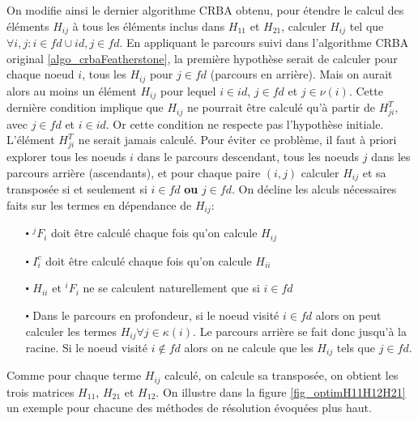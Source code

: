 \documentclass{report}
\begin{document}
On modifie ainsi le dernier algorithme CRBA obtenu, pour étendre le calcul des éléments $H_{ij}$ à tous les éléments inclus dans $H_{11}$ et $H_{21}$, \cad calculer $H_{ij}$ tel que $\forall i,j: i \in fd \cup id, j \in fd$. En appliquant le parcours suivi dans l'algorithme CRBA original \ref{algo_crbaFeatherstone}, la première hypothèse serait de calculer pour chaque noeud $i$, tous les $H_{ij}$ pour $j \in fd$ (parcours en arrière). Mais on aurait alors au moins un élément $H_{ij}$ pour lequel $i \in id$, $j \in fd$ et $j \in \nu(i)$. Cette dernière condition implique que $H_{ij}$ ne pourrait être calculé qu'à partir de $H_{ji}^T$, avec $j \in fd$ et $i \in id$. Or cette condition ne respecte pas l'hypothèse initiale. L'élément $H_{ji}^T$ ne serait jamais calculé. Pour éviter ce problème, il faut à priori explorer tous les noeuds $i$ dans le parcours descendant, tous les noeuds $j$ dans les parcours arrière (ascendants), et pour chaque paire $(i,j)$ calculer $H_{ij}$ et sa transposée si et seulement si $i \in fd$ \textbf{ou} $j \in fd$.
On décline les alculs nécessaires faits sur les termes en dépendance de $H_{ij}$: \\
\begin{itemize}
\item[$\centerdot$] $^jF_i$ doit être calculé chaque fois qu'on calcule $H_{ij}$
\item[$\centerdot$] $I_i^c$ doit être calculé chaque fois qu'on calcule $H_{ii}$
\item[$\centerdot$] $H_{ii}$ et $^iF_i$ ne se calculent naturellement que si $i \in fd$
\item[$\centerdot$] Dans le parcours en profondeur, si le noeud visité $i \in fd$ alors on peut calculer les termes $H_{ij} \forall j \in \kappa(i)$. Le parcours arrière se fait donc jusqu'à la racine. Si le noeud visité $i \notin fd$ alors on ne calcule que les $H_{ij}$ tels que $j \in fd$.
\end{itemize}

Comme pour chaque terme $H_{ij}$ calculé, on calcule sa transposée, on obtient les trois matrices $H_{11}$, $H_{21}$ et $H_{12}$. On illustre dans la figure \ref{fig_optimH11H12H21}  un exemple pour chacune des méthodes de résolution évoquées plus haut. \\

\end{document}
